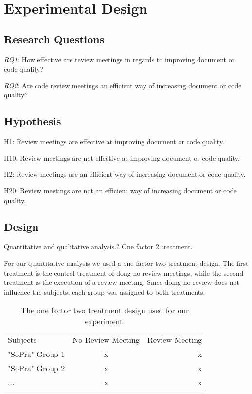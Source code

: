 \section{Experimental Design}

\subsection{Research Questions}

\textit{RQ1:} How effective are review meetings in regards to improving document or code quality?

\textit{RQ2:} Are code review meetings an efficient way of increasing document or code quality?



\subsection{Hypothesis}

H1: Review meetings are effective at improving document or code quality.

H10: Review meetings are not effective at improving document or code quality.

H2: Review meetings are an efficient way of increasing document or code quality.

H20: Review meetings are not an efficient way of increasing document or code quality.

\subsection{Design}

Quantitative and qualitative analysis.?
One factor 2 treatment.

For our quantitative analysis we used a one factor two treatment design. The first treatment is the control treatment of dong no review meetings, while the second treatment is the execution of a review meeting. Since doing no review does not influence the subjects, each group was assigned to both treatments.


\begin{table}
\begin{tabular}{lcr}
  \rowcolor{heading}Subjects & No Review Meeting & Review Meeting \\
  \rowcolor{a}"SoPra" Group 1 & x & x \\
  \rowcolor{b}"SoPra" Group 2 & x & x \\
  \rowcolor{a}... & x & x \\
\end{tabular}
\caption{The one factor two treatment design used for our experiment.}
\end{table}


